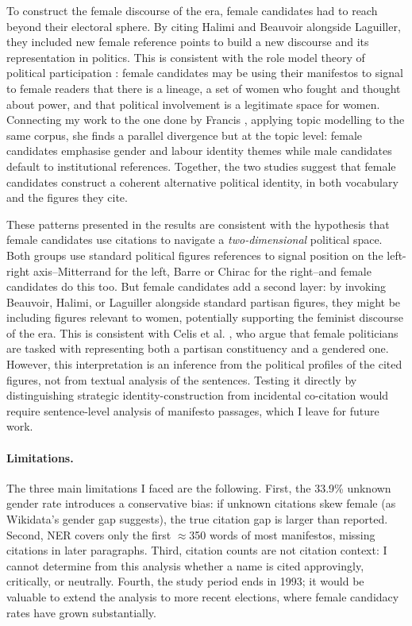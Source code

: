 \documentclass{article}
\begin{document}
To construct the female discourse of the era, female candidates had to reach beyond their electoral sphere. By citing Halimi and Beauvoir alongside Laguiller, they included new female reference points to build a new discourse and its representation in politics. This is consistent with the role model theory of political participation \cite{campbell2006}: female candidates may be using their manifestos to signal to female readers that there is a lineage, a set of women who fought and thought about power, and that political involvement is a legitimate space for women. Connecting my work to the one done by Francis \cite{francis2026}, applying topic modelling to the same corpus, she finds a parallel divergence but at the topic level: female candidates emphasise gender and labour identity themes while male candidates default to institutional references. Together, the two studies suggest that female candidates construct a coherent alternative political identity, in both vocabulary and the figures they cite.

These patterns presented in the results are consistent with the hypothesis that female candidates use citations to navigate a \emph{two-dimensional} political space. Both groups use standard political figures references to signal position on the left-right axis--Mitterrand for the left, Barre or Chirac for the right--and female candidates do this too. But female candidates add a second layer: by invoking Beauvoir, Halimi, or Laguiller alongside standard partisan figures, they might be including figures relevant to women, potentially supporting the feminist discourse of the era. This is consistent with Celis et al. \cite{celis2008}, who argue that female politicians are tasked with representing both a partisan constituency and a gendered one. However, this interpretation is an inference from the political profiles of the cited figures, not from textual analysis of the sentences. Testing it directly by distinguishing strategic identity-construction from incidental co-citation would require sentence-level analysis of manifesto passages, which I leave for future work.

\paragraph{Limitations.}
The three main limitations I faced are the following. First, the 33.9\% unknown gender rate introduces a conservative bias: if unknown citations skew female (as Wikidata's gender gap suggests), the true citation gap is larger than reported. Second, NER covers only the first $\approx$350 words of most manifestos, missing citations in later paragraphs. Third, citation counts are not citation context: I cannot determine from this analysis whether a name is cited approvingly, critically, or neutrally. Fourth, the study period ends in 1993; it would be valuable to extend the analysis to more recent elections, where female candidacy rates have grown substantially.
\end{document}
